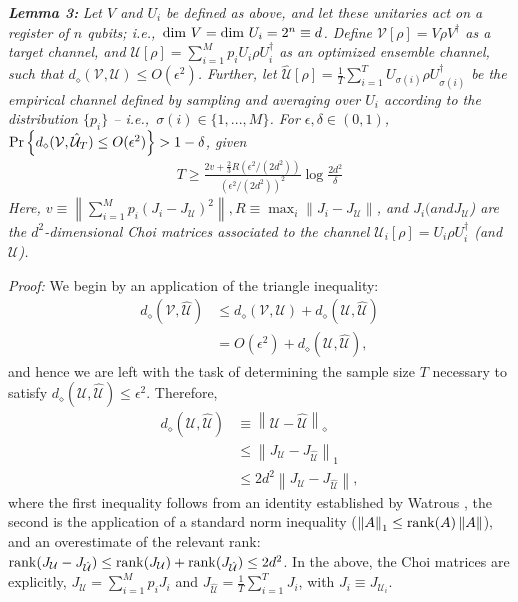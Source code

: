 \documentclass[fleqn,10pt]{wlscirep}
\newcommand{\ie}{\emph{i.e.,~}}
\newcommand{\dg}{^\dagger}
\newcommand{\nn}{\nonumber}
\newcommand{\pr}{{\rm Pr}}
\newcommand{\normo}[1]{\left\lVert #1 \right\rVert}
\newcommand{\normt}[1]{\left\lVert #1 \right\rVert_1}
\newcommand{\normd}[1]{\left\lVert #1 \right\rVert_\diamond}
\begin{document}
\noindent \emph{\bf Lemma 3:} \emph{Let $V$ and $U_i$ be defined as above, and let these unitaries act on a register of $n$ qubits; \ie ${\rm dim}~ V = {\rm dim}~ U_i = 2^n \equiv d$. Define $\mathcal{V}[\rho] = V \rho V^{\dagger}$ as a target channel, and $\mathcal{U}[\rho] = \sum_{i=1}^M p_i U_i \rho U_i\dg$ as an optimized ensemble channel, such that $d_\diamond(\mathcal{V}, \mathcal{U})\leq O(\epsilon^2)$. Further, let $\hat{\mathcal{U}}[\rho] = \frac{1}{T}\sum_{i=1}^T U_{\sigma(i)} \rho U_{\sigma(i)}\dg$ be the empirical channel defined by sampling and averaging over $U_i$ according to the distribution $\{p_i\}$ -- \ie $\sigma(i) \in \{1,...,M\}$. For $\epsilon, \delta \in (0,1)$, $\pr\left\{ d_\diamond(\mathcal{V}, \hat{\mathcal{U}}_T) \leq O(\epsilon^2) \right\} > 1-\delta$, given
\begin{align}
    T \geq \frac{2v + \frac{2}{3}R \left(\epsilon^2/(2d^2)\right) }{\left(\epsilon^2/(2d^2)\right)^2}\log \frac{2d^2}{\delta}
    \label{eq:T_bound}
\end{align}
Here, $v \equiv \normo{\sum_{i=1}^M p_i (J_i - J_{\mathcal{U}})^2}, R \equiv \max_i \normo{J_i - J_{\mathcal{U}}}$, and $J_i (and J_{\mathcal{U}}$) are the $d^2$-dimensional Choi matrices associated to the channel $\mathcal{U}_i[\rho] = U_i \rho U_i^{\dagger}$ (and $\mathcal{U}$).}

\noindent \textit{Proof:} We begin by an application of the triangle inequality:
\begin{align}
    d_\diamond(\mathcal{V}, \hat{\mathcal{U}}) &\leq  d_\diamond(\mathcal{V}, \mathcal{U}) +  d_\diamond(\mathcal{U}, \hat{\mathcal{U}}) \nn \\  
    & = O(\epsilon^2) + d_\diamond(\mathcal{U}, \hat{\mathcal{U}}),
    \label{eq:lemma3_1}
\end{align}
and hence we are left with the task of determining the sample size $T$ necessary to satisfy $d_\diamond(\mathcal{U}, \hat{\mathcal{U}}) \leq \epsilon^2$. Therefore, 
\begin{align}
    d_\diamond(\mathcal{U}, \hat{\mathcal{U}}) &\equiv \normd{\mathcal{U}- \hat{\mathcal{U}}} \nn \\
    & \leq \normt{J_\mathcal{U} - J_{\hat{\mathcal{U}}}} \nn \\
    & \leq 2d^2 \normo{J_\mathcal{U} - J_{\hat{\mathcal{U}}}},
\end{align}
where the first inequality follows from an identity established by Watrous \cite[Exercise 3.6]{watrous_2018}, the second is the application of a standard norm inequality ($\normt{A}\leq {\rm rank}(A)\normo{A}$), and an overestimate of the relevant rank: ${\rm rank}(J_\mathcal{U} - J_{\hat{\mathcal{U}}}) \leq {\rm rank}(J_\mathcal{U} ) + {\rm rank}(J_{\hat{\mathcal{U}}}) \leq 2d^2$. In the above, the Choi matrices are explicitly, $J_\mathcal{U} = \sum_{i=1}^M p_i J_i$ and $J_{\hat{\mathcal{U}}} = \frac{1}{T} \sum_{i=1}^T J_i$, with $J_i \equiv J_{\mathcal{U}_i}$. 
\end{document}
